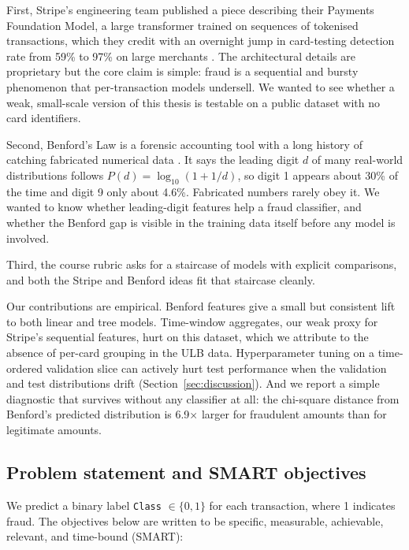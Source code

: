 \documentclass{article}
\begin{document}
First, Stripe's engineering team published a piece describing their Payments Foundation Model, a large transformer trained on sequences of tokenised transactions, which they credit with an overnight jump in card-testing detection rate from 59\% to 97\% on large merchants \cite{stripeflywheel2024}. The architectural details are proprietary but the core claim is simple: fraud is a sequential and bursty phenomenon that per-transaction models undersell. We wanted to see whether a weak, small-scale version of this thesis is testable on a public dataset with no card identifiers.

Second, Benford's Law is a forensic accounting tool with a long history of catching fabricated numerical data \cite{nigrini2012}. It says the leading digit $d$ of many real-world distributions follows $P(d) = \log_{10}(1 + 1/d)$, so digit 1 appears about 30\% of the time and digit 9 only about 4.6\%. Fabricated numbers rarely obey it. We wanted to know whether leading-digit features help a fraud classifier, and whether the Benford gap is visible in the training data itself before any model is involved.

Third, the course rubric asks for a staircase of models with explicit comparisons, and both the Stripe and Benford ideas fit that staircase cleanly.

Our contributions are empirical. Benford features give a small but consistent lift to both linear and tree models. Time-window aggregates, our weak proxy for Stripe's sequential features, hurt on this dataset, which we attribute to the absence of per-card grouping in the ULB data. Hyperparameter tuning on a time-ordered validation slice can actively hurt test performance when the validation and test distributions drift (Section~\ref{sec:discussion}). And we report a simple diagnostic that survives without any classifier at all: the chi-square distance from Benford's predicted distribution is 6.9$\times$ larger for fraudulent amounts than for legitimate amounts.

\subsection{Problem statement and SMART objectives}

We predict a binary label \texttt{Class} $\in \{0, 1\}$ for each transaction, where 1 indicates fraud. The objectives below are written to be specific, measurable, achievable, relevant, and time-bound (SMART):
\end{document}
